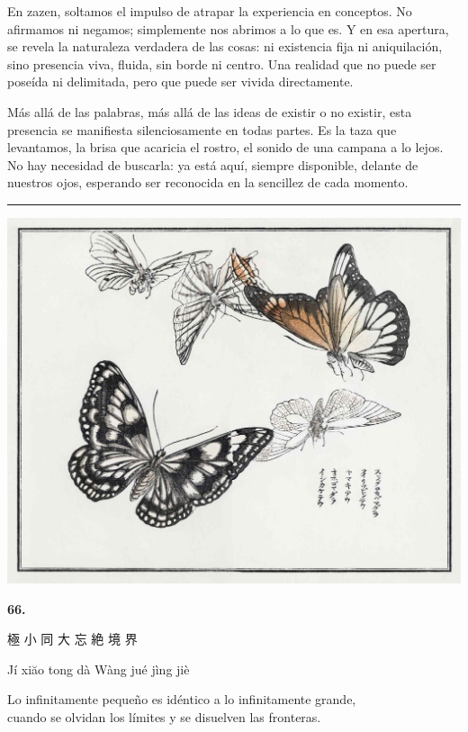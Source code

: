 \documentclass[
  a5paperpaper,
]{article}
\begin{document}
En zazen, soltamos el impulso de atrapar la experiencia en conceptos. No
afirmamos ni negamos; simplemente nos abrimos a lo que es. Y en esa
apertura, se revela la naturaleza verdadera de las cosas: ni existencia
fija ni aniquilación, sino presencia viva, fluida, sin borde ni centro.
Una realidad que no puede ser poseída ni delimitada, pero que puede ser
vivida directamente.

Más allá de las palabras, más allá de las ideas de existir o no existir,
esta presencia se manifiesta silenciosamente en todas partes. Es la taza
que levantamos, la brisa que acaricia el rostro, el sonido de una
campana a lo lejos. No hay necesidad de buscarla: ya está aquí, siempre
disponible, delante de nuestros ojos, esperando ser reconocida en la
sencillez de cada momento.

\hfill\break

\begin{center}\rule{0.5\linewidth}{0.5pt}\end{center}

\hfill\break

\hypertarget{01}{}
\includegraphics{../img/image14.jpg}

\begin{verseblock}

\newpage

\begin{center}\textbf{66.}\end{center}

極 小 同 大 忘 絶 境 界

Jí xiăo tong dà Wàng jué jìng jiè

Lo infinitamente pequeño es idéntico a lo infinitamente grande,\\
cuando se olvidan los límites y se disuelven las fronteras.

\end{verseblock}
\end{document}

